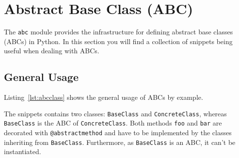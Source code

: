 
\section{Abstract Base Class (ABC)}

The \lstinline{abc} module provides the infrastructure for defining abstract base classes (ABCs) in Python.
In this section you will find a collection of snippets being useful when dealing with ABCs.


\subsection{General Usage}

Listing~\ref{lst:abcclass} shows the general usage of ABCs by example.



The snippets contains two classes: \lstinline{BaseClass} and \lstinline{ConcreteClass}, whereas \lstinline{BaseClass} is the ABC of \linebreak\lstinline{ConcreteClass}.
Both methods \lstinline{foo} and \lstinline{bar} are decorated with \lstinline{@abstractmethod} and have to be implemented by the classes inheriting from \lstinline{BaseClass}.
Furthermore, as \lstinline{BaseClass} is an ABC, it can't be instantiated.
